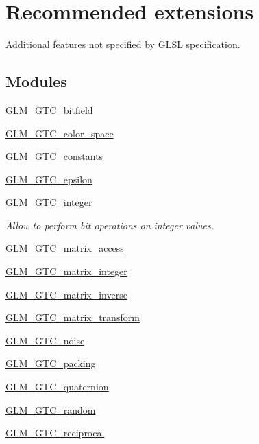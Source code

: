 \hypertarget{group__gtc}{}\section{Recommended extensions}
\label{group__gtc}


Additional features not specified by G\+L\+SL specification.  


\subsection*{Modules}
\begin{DoxyCompactItemize}
\item 
\hyperlink{group__gtc__bitfield}{G\+L\+M\+\_\+\+G\+T\+C\+\_\+bitfield}
\item 
\hyperlink{group__gtc__color__space}{G\+L\+M\+\_\+\+G\+T\+C\+\_\+color\+\_\+space}
\item 
\hyperlink{group__gtc__constants}{G\+L\+M\+\_\+\+G\+T\+C\+\_\+constants}
\item 
\hyperlink{group__gtc__epsilon}{G\+L\+M\+\_\+\+G\+T\+C\+\_\+epsilon}
\item 
\hyperlink{group__gtc__integer}{G\+L\+M\+\_\+\+G\+T\+C\+\_\+integer}
\begin{DoxyCompactList}\small\item\em Allow to perform bit operations on integer values. \end{DoxyCompactList}\item 
\hyperlink{group__gtc__matrix__access}{G\+L\+M\+\_\+\+G\+T\+C\+\_\+matrix\+\_\+access}
\item 
\hyperlink{group__gtc__matrix__integer}{G\+L\+M\+\_\+\+G\+T\+C\+\_\+matrix\+\_\+integer}
\item 
\hyperlink{group__gtc__matrix__inverse}{G\+L\+M\+\_\+\+G\+T\+C\+\_\+matrix\+\_\+inverse}
\item 
\hyperlink{group__gtc__matrix__transform}{G\+L\+M\+\_\+\+G\+T\+C\+\_\+matrix\+\_\+transform}
\item 
\hyperlink{group__gtc__noise}{G\+L\+M\+\_\+\+G\+T\+C\+\_\+noise}
\item 
\hyperlink{group__gtc__packing}{G\+L\+M\+\_\+\+G\+T\+C\+\_\+packing}
\item 
\hyperlink{group__gtc__quaternion}{G\+L\+M\+\_\+\+G\+T\+C\+\_\+quaternion}
\item 
\hyperlink{group__gtc__random}{G\+L\+M\+\_\+\+G\+T\+C\+\_\+random}
\item 
\hyperlink{group__gtc__reciprocal}{G\+L\+M\+\_\+\+G\+T\+C\+\_\+reciprocal}

\end{DoxyCompactItemize}
